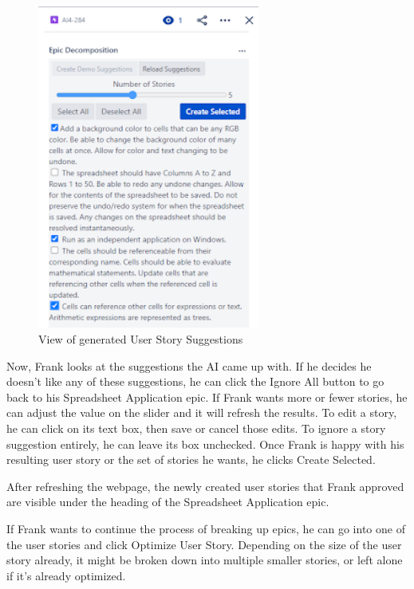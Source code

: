 \begin{figure}
\centerline{\includegraphics[width=0.65\textwidth,height=0.65\textheight,keepaspectratio]{./figure/Scenario1Figure2.png}}
\caption{View of generated User Story Suggestions}
\end{figure}

Now, Frank looks at the suggestions the AI came up with. If he decides he doesn’t like any of these suggestions, he can click the Ignore All button to go back to his Spreadsheet Application epic. If Frank wants more or fewer stories, he can adjust the value on the slider and it will refresh the results. To edit a story, he can click on its text box, then save or cancel those edits. To ignore a story suggestion entirely, he can leave its box unchecked. Once Frank is happy with his resulting user story or the set of stories he wants, he clicks Create Selected. 

After refreshing the webpage, the newly created user stories that Frank approved are visible under the heading of the Spreadsheet Application epic.

If Frank wants to continue the process of breaking up epics, he can go into one of the user stories and click Optimize User Story. Depending on the size of the user story already, it might be broken down into multiple smaller stories, or left alone if it’s already optimized.

